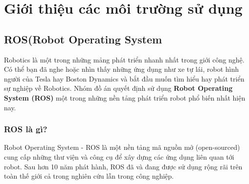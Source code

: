 \section{Giới thiệu các môi trường sử dụng}
\subsection{ROS(Robot Operating System}
Robotics là một trong những mảng phát triển nhanh nhất trong giới công nghệ. Có thể bạn đã nghe hoặc nhìn thấy những ứng dụng như xe tự lái, robot hình người của Tesla hay Boston Dynamics và bắt đầu muốn tìm hiểu hay phát triển sự nghiệp về Robotics. Nhóm đồ án quyết định sử dụng \textbf{Robot Operating System (ROS)} một trong những nền tảng phát triển robot phổ biến nhất hiện nay.
\subsubsection{ROS là gì?}
Robot Operating System - ROS là một nền tảng mã nguồn mở (open-sourced) cung cấp những thư viện và công cụ để xây dựng các ứng dụng liên quan tới robot. Sau hơn 10 năm phát hành, ROS đã và đang được sử dụng rộng rãi trên toàn thế giới cả trong nghiên cứu lẫn trong công nghiệp.
